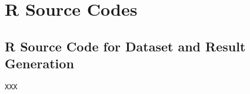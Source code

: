 \chapter{R Source Codes}
\section{R Source Code for Dataset and Result Generation}
\begin{lstlisting}[breaklines]
XXX

\end{lstlisting}

